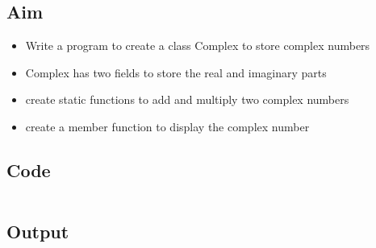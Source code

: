 \documentclass[../main.tex]{subfiles}
\begin{document}
\subsection{Aim}
\begin{itemize}
	\item Write a program to create a class Complex to store complex numbers
  \item Complex has two fields to store the real and imaginary parts
  \item create static functions to add and multiply two complex numbers
  \item create a member function to display the complex number
\end{itemize}

\subsection{Code}
\inputminted[frame=lines, breaklines, breakanywhere, numberblanklines=false]{java}{./programs/prog2/Complex.java}

\subsection{Output}
\end{document}
